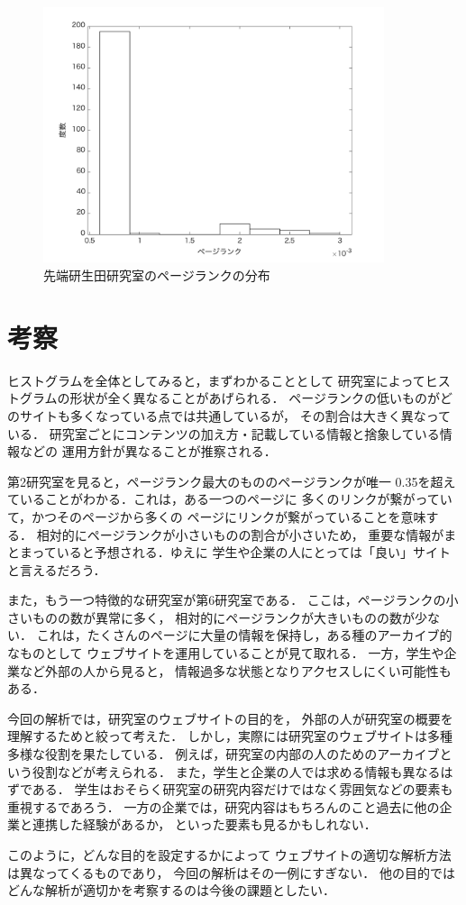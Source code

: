 \documentclass[10pt]{jarticle}
\begin{document}
\begin{figure}[H]
  \begin{center}
  \includegraphics[width=10cm]{../histograms/ia.png}
  \caption{先端研生田研究室のページランクの分布}
  \end{center}
\end{figure}

\section{考察}

ヒストグラムを全体としてみると，まずわかることとして
研究室によってヒストグラムの形状が全く異なることがあげられる．
ページランクの低いものがどのサイトも多くなっている点では共通しているが，
その割合は大きく異なっている．
研究室ごとにコンテンツの加え方・記載している情報と捨象している情報などの
運用方針が異なることが推察される．

第2研究室を見ると，ページランク最大のもののページランクが唯一
0.35を超えていることがわかる．これは，ある一つのページに
多くのリンクが繋がっていて，かつそのページから多くの
ページにリンクが繋がっていることを意味する．
相対的にページランクが小さいものの割合が小さいため，
重要な情報がまとまっていると予想される．ゆえに
学生や企業の人にとっては「良い」サイトと言えるだろう．

また，もう一つ特徴的な研究室が第6研究室である．
ここは，ページランクの小さいものの数が異常に多く，
相対的にページランクが大きいものの数が少ない．
これは，たくさんのページに大量の情報を保持し，ある種のアーカイブ的なものとして
ウェブサイトを運用していることが見て取れる．
一方，学生や企業など外部の人から見ると，
情報過多な状態となりアクセスしにくい可能性もある．

今回の解析では，研究室のウェブサイトの目的を，
外部の人が研究室の概要を理解するためと絞って考えた．
しかし，実際には研究室のウェブサイトは多種多様な役割を果たしている．
例えば，研究室の内部の人のためのアーカイブという役割などが考えられる．
また，学生と企業の人では求める情報も異なるはずである．
学生はおそらく研究室の研究内容だけではなく雰囲気などの要素も重視するであろう．
一方の企業では，研究内容はもちろんのこと過去に他の企業と連携した経験があるか，
といった要素も見るかもしれない．

このように，どんな目的を設定するかによって
ウェブサイトの適切な解析方法は異なってくるものであり，
今回の解析はその一例にすぎない．
他の目的ではどんな解析が適切かを考察するのは今後の課題としたい．
\end{document}
